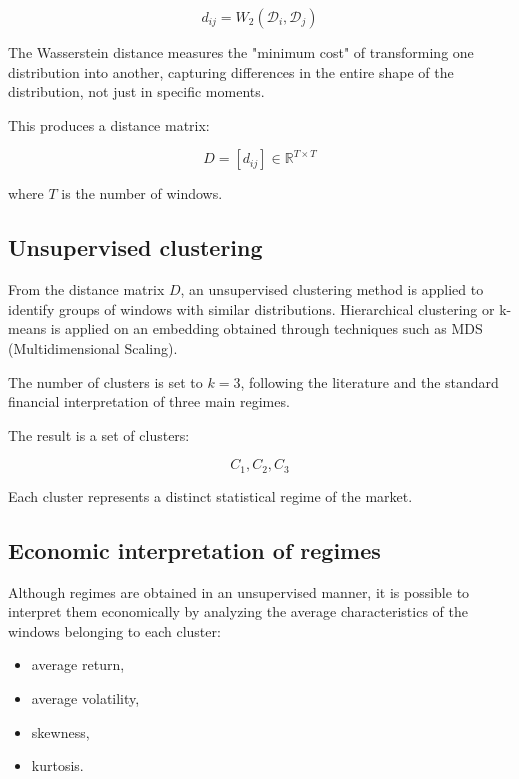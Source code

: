 \documentclass[12pt]{article}
\begin{document}
\[
d_{ij} = W_2(\mathcal{D}_i, \mathcal{D}_j)
\]



The Wasserstein distance measures the "minimum cost" of transforming one distribution into another, capturing differences in the entire shape of the distribution, not just in specific moments.

This produces a distance matrix:



\[
D = [d_{ij}] \in \mathbb{R}^{T \times T}
\]



where $T$ is the number of windows.

\subsection{Unsupervised clustering}

From the distance matrix $D$, an unsupervised clustering method is applied to identify groups of windows with similar distributions. Hierarchical clustering or k-means is applied on an embedding obtained through techniques such as MDS (Multidimensional Scaling).

The number of clusters is set to $k = 3$, following the literature and the standard financial interpretation of three main regimes.

The result is a set of clusters:



\[
C_1, C_2, C_3
\]



Each cluster represents a distinct statistical regime of the market.

\subsection{Economic interpretation of regimes}

Although regimes are obtained in an unsupervised manner, it is possible to interpret them economically by analyzing the average characteristics of the windows belonging to each cluster:

\begin{itemize}
    \item average return,
    \item average volatility,
    \item skewness,
    \item kurtosis.
\end{itemize}
\end{document}
